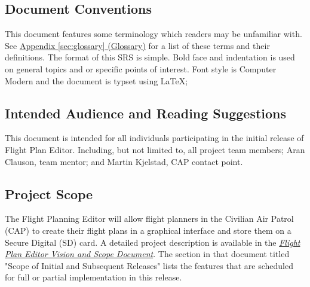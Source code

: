 \documentclass[12pt, letterpaper]{article}
\begin{document}
  \subsection{Document Conventions}
  This document features some terminology which readers may be unfamiliar with.
  See \hyperref[sec:glossary]{Appendix \ref{sec:glossary} (Glossary)} for a list of these terms and their definitions.
  The format of this SRS is simple. Bold face and indentation is used on general topics and or specific points of interest.
  Font style is Computer Modern and the document is typset using \LaTeX;
  \subsection{Intended Audience and Reading Suggestions}
  This document is intended for all individuals participating in the initial release of Flight Plan Editor.
  Including, but not limited to, all project team members; Aran Clauson, team mentor; and Martin Kjelstad, CAP contact point.

  \subsection{Project Scope}
  The Flight Planning Editor will allow flight planners in the Civilian Air Patrol (CAP)
  to create their flight plans in a graphical interface and store them on a Secure Digital (SD) card.
  A detailed project description is available in the \hyperref[sec:ref]{\textit{Flight Plan Editor Vision and Scope Document}}.
  The section in that document titled "Scope of Initial and Subsequent Releases" lists the features that are
  scheduled for full or partial implementation in this release.
\end{document}
